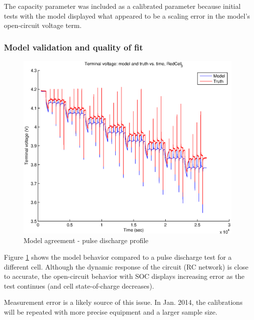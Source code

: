 \documentclass[../SimBALink.tex]{subfiles}
\begin{document}
			The capacity parameter was included as a calibrated parameter because initial tests with the model displayed what appeared to be a scaling error in the model's open-circuit voltage term.
			
	\subsubsection{Model validation and quality of fit}
		\begin{figure}[h!]
				\centering
				\includegraphics[width=5in]{ModelAgreement_RedCell_3_Pulse}
				\caption{Model agreement - pulse discharge profile}
				\label{fig:Pulse_Discharge_Current_Validation}
			\end{figure}
		
		Figure \ref{fig:Pulse_Discharge_Current_Validation} shows the model behavior compared to a pulse discharge test for a different cell. Although the dynamic response of the circuit (RC network) is close to accurate, the open-circuit behavior with SOC displays increasing error as the test continues (and cell state-of-charge decreases).
		
		Measurement error is a likely source of this issue. In Jan. 2014, the calibrations will be repeated with more precise equipment and a larger sample size.
		
		
\end{document}
